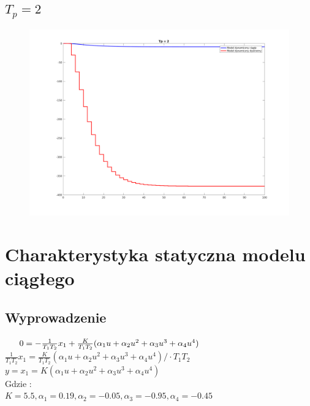 \documentclass[a4paper, 11pt]{article}
\begin{document}
\subsection{$T_p = 2$}
\begin{figure}[H]
\centering
\includegraphics[scale=0.45]{tp_2.png}
\end{figure}
 
\section{Charakterystyka statyczna modelu ciągłego}
\subsection{Wyprowadzenie}


$\indent0 = -\frac{1}{T_{1}T_{2}}x_1 + \frac{K}{T_{1}T_{2}}(\alpha_1u + \alpha_2u^2 + \alpha_3u^3 + \alpha_4u^4)$
\\

$\frac{1}{T_{1}T_{2}}x_1 =  \frac{K}{T_{1}T_{2}}(\alpha_1u + \alpha_2u^2 + \alpha_3u^3 + \alpha_4u^4)/\cdot T_1T_2$
\\

$y = x_1 = K(\alpha_1u + \alpha_2u^2 + \alpha_3u^3 + \alpha_4u^4)$\\

Gdzie : \\

$K  = 5.5,\alpha_1 = 0.19, \alpha_2 = -0.05, \alpha_3 = -0.95, \alpha_4 = -0.45$
\end{document}
